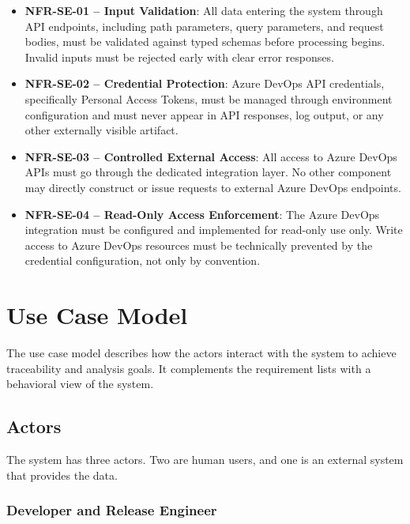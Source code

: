\begin{itemize}
  \item \textbf{NFR-SE-01 -- Input Validation}: All data entering the system through API endpoints, including path parameters, query parameters, and request bodies, must be validated against typed schemas before processing begins. Invalid inputs must be rejected early with clear error responses.

  \item \textbf{NFR-SE-02 -- Credential Protection}: Azure DevOps API credentials, specifically Personal Access Tokens, must be managed through environment configuration and must never appear in API responses, log output, or any other externally visible artifact.

  \item \textbf{NFR-SE-03 -- Controlled External Access}: All access to Azure DevOps APIs must go through the dedicated integration layer. No other component may directly construct or issue requests to external Azure DevOps endpoints.

  \item \textbf{NFR-SE-04 -- Read-Only Access Enforcement}: The Azure DevOps integration must be configured and implemented for read-only use only. Write access to Azure DevOps resources must be technically prevented by the credential configuration, not only by convention.
\end{itemize}

\section{Use Case Model}
\label{sec:use-case-model}

The use case model describes how the actors interact with the system to achieve
traceability and analysis goals. It complements the requirement lists with a
behavioral view of the system.

\subsection{Actors}
\label{subsec:actors}

The system has three actors. Two are human users, and one is an external system
that provides the data.

\subsubsection{Developer and Release Engineer}

